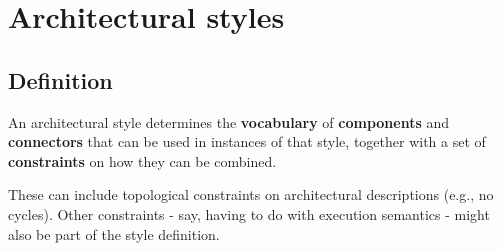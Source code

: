 \section{Architectural styles}

\subsection{Definition}

\begin{definitionbox}
    An architectural style determines the \textbf{vocabulary} of \textbf{components} and \textbf{connectors} that can be used in instances of that style, together with a set of \textbf{constraints} on how they can be combined.

    \highspace
    These can include topological constraints on architectural descriptions (e.g., no cycles). Other constraints - say, having to do with execution semantics - might also be part of the style definition.
\end{definitionbox}